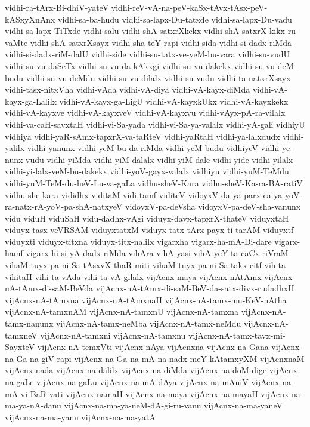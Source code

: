 {vidhi-ra-tArx-Bi-dhiV-yateV
vidhi-reV-vA-na-peV-kaSx-tAvx-tAsx-peV-kASxyXnAnx
vidhi-sa-ba-hudu
vidhi-sa-lapx-Du-tatxde
vidhi-sa-lapx-Du-vadu
vidhi-sa-lapx-TiTxde
vidhi-salu
vidhi-shA-satxrXkekx
vidhi-shA-satxrX-kikx-ru-vaMte
vidhi-shA-satxrXsayx
vidhi-sha-teY-rapi
vidhi-sida
vidhi-si-dadx-riMda
vidhi-si-dadx-riM-dalU
vidhi-side
vidhi-su-tatx-ve-yeM-bu-vara
vidhi-su-vudU
vidhi-su-vu-daSeTx
vidhi-su-vu-da-kAkxgi
vidhi-su-vu-dakekx
vidhi-su-vu-deM-budu
vidhi-su-vu-deMdu
vidhi-su-vu-dilalx
vidhi-su-vudu
vidhi-ta-natxrXsayx
vidhi-tasx-nitxVha
vidhi-vAda
vidhi-vA-diya
vidhi-vA-kayx-diMda
vidhi-vA-kayx-ga-Lalilx
vidhi-vA-kayx-ga-LigU
vidhi-vA-kayxkUkx
vidhi-vA-kayxkekx
vidhi-vA-kayxve
vidhi-vA-kayxveV
vidhi-vA-kayxvu
vidhi-vAyx-pA-ra-vilalx
vidhi-va-caH-savxtaH
vidhi-vi-Sa-yada
vidhi-vi-Sa-ya-valalx
vidhi-yA-gali
vidhiyU
vidhiya
vidhi-yaR-sAmx-tapxrX-va-taRteV
vidhi-yaRtaH
vidhi-ya-lalxdudx
vidhi-yalilx
vidhi-yanunx
vidhi-yeM-bu-da-riMda
vidhi-yeM-budu
vidhiyeV
vidhi-ye-nunx-vudu
vidhi-yiMda
vidhi-yiM-dalalx
vidhi-yiM-dale
vidhi-yide
vidhi-yilalx
vidhi-yi-lalx-veM-bu-dakekx
vidhi-yoV-gayx-valalx
vidhiyu
vidhi-yuM-TeMdu
vidhi-yuM-TeM-du-heV-Lu-va-gaLa
vidhu-sheV-Kara
vidhu-sheV-Ka-ra-BA-ratiV
vidhu-she-kara
vididhx
viditaM
vidi-tamf
viditeV
vidoyxV-da-ya-parx-ca-ya-yoV-ra-natx-rA-yoV-pa-shA-natxyeV
vidoyxV-pa-deVsha
vidoyxV-pa-deV-sha-vanunx
vidu
viduH
viduSaH
vidu-dadhx-vAgi
viduyx-davx-tapxrX-thateV
viduyxtaH
viduyx-tasx-veVRSAM
viduyxtatxM
viduyx-tatx-tArx-payx-ti-tarAM
viduyxtf
viduyxti
viduyx-titxna
viduyx-titx-nalilx
vigarxha
vigarx-ha-mA-Di-dare
vigarx-hamf
vigarx-hi-si-yA-dadx-riMda
vihAra
vihA-yasi
vihA-yeY-ta-caCx-riVraM
vihaM-tuyx-pa-ni-Sa-tAsxvX-thaR-miti
vihaM-tuyx-pa-ni-Sa-takx-citf
vihita
vihitaH
vihi-ta-vAda
vihi-ta-vA-gilalx
vijAcnx-maya
vijAcnx-nAtAmx
vijAcnx-nA-tAmx-di-saM-BeVda
vijAcnx-nA-tAmx-di-saM-BeV-da-satx-divx-rudadhxH
vijAcnx-nA-tAmxna
vijAcnx-nA-tAmxnaH
vijAcnx-nA-tamx-mu-KeV-nAtha
vijAcnx-nA-tamxnAM
vijAcnx-nA-tamxnU
vijAcnx-nA-tamxna
vijAcnx-nA-tamx-nanunx
vijAcnx-nA-tamx-neMba
vijAcnx-nA-tamx-neMdu
vijAcnx-nA-tamxneV
vijAcnx-nA-tamxni
vijAcnx-nA-tamxnu
vijAcnx-nA-tamx-tavx-mi-SayxteV
vijAcnx-nA-temxVti
vijAcnx-nAya
vijAcnxna
vijAcnx-na-Gana
vijAcnx-na-Ga-na-giV-rapi
vijAcnx-na-Ga-na-mA-na-nadx-meY-kAtamxyXM
vijAcnxnaM
vijAcnx-nada
vijAcnx-na-dalilx
vijAcnx-na-diMda
vijAcnx-na-doM-dige
vijAcnx-na-gaLe
vijAcnx-na-gaLu
vijAcnx-na-mA-dAya
vijAcnx-na-mAniV
vijAcnx-na-mA-vi-BaR-vati
vijAcnx-namaH
vijAcnx-na-maya
vijAcnx-na-mayaH
vijAcnx-na-ma-ya-nA-danu
vijAcnx-na-ma-ya-neM-dA-gi-ru-vanu
vijAcnx-na-ma-yaneV
vijAcnx-na-ma-yanu
vijAcnx-na-ma-yatA
}
